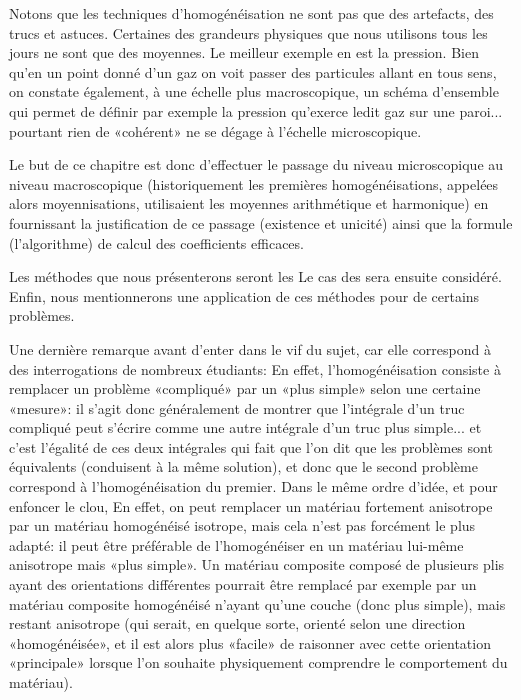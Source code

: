 \medskip{}
Notons que les techniques d'homogénéisation ne sont pas que des artefacts, des trucs et astuces.
Certaines des grandeurs physiques que nous utilisons tous les jours ne sont que des moyennes. Le meilleur exemple en est la pression. Bien qu'en un point donné d'un gaz on voit passer des particules allant en tous sens, on constate également, à une échelle plus macroscopique, un schéma d'ensemble qui permet de définir par exemple la pression qu'exerce ledit gaz sur une paroi... pourtant rien de «cohérent» ne se dégage à l'échelle microscopique.

\medskip
Le but de ce chapitre est donc d'effectuer le passage du niveau microscopique au niveau macroscopique (historiquement les premières homogénéisations, appelées alors moyennisations, utilisaient les moyennes arithmétique et harmonique) en fournissant la justification de ce passage (existence et unicité) ainsi que la formule (l'algorithme) de calcul des coefficients efficaces.

\medskip
Les méthodes que nous présenterons seront les  Le cas des  sera ensuite considéré. Enfin, nous mentionnerons une application de ces méthodes pour  de certains problèmes.

\medskip
Une dernière remarque avant d'enter dans le vif du sujet, car elle correspond à des interrogations de nombreux étudiants:  En effet, l'homogénéisation consiste à remplacer un problème «compliqué» par un «plus simple» selon une certaine «mesure»: il s'agit donc généralement de montrer que l'intégrale d'un truc compliqué peut s'écrire comme une autre intégrale d'un truc plus simple... et c'est l'égalité de ces deux intégrales qui fait que l'on dit que les problèmes sont équivalents (conduisent à la même solution), et donc que le second problème correspond à l'homogénéisation du premier. Dans le même ordre d'idée, et pour enfoncer le clou,  En effet, on peut remplacer un matériau fortement anisotrope par un matériau homogénéisé isotrope, mais cela n'est pas forcément le plus adapté: il peut être préférable de l'homogénéiser en un matériau lui-même anisotrope mais «plus simple». Un matériau composite composé de plusieurs plis ayant des orientations différentes pourrait être remplacé par exemple par un matériau composite homogénéisé n'ayant qu'une couche (donc plus simple), mais restant anisotrope (qui serait, en quelque sorte, orienté selon une direction «homogénéisée», et il est alors plus «facile» de raisonner avec cette orientation «principale» lorsque l'on souhaite physiquement comprendre le comportement du matériau).


